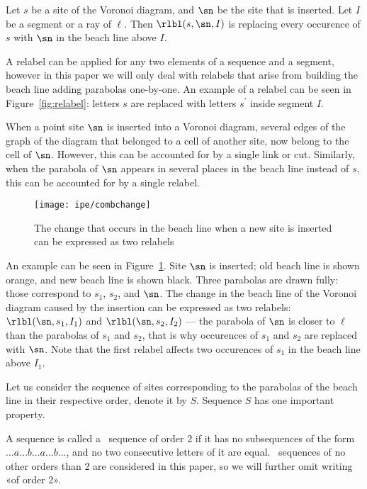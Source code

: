 \begin{definition}
	Let $s$ be a site of the Voronoi diagram, and $\sn$ be the site that is inserted. Let $I$ be a segment or a ray of $\ell$. Then $\rlbl(s,\sn,I)$ is replacing every occurence of $s$ with $\sn$ in the beach line above $I$.
\end{definition}

A relabel can be applied for any two elements of a sequence and a segment, however in this paper we will only deal with relabels that arise from building the beach line adding parabolas one-by-one. An example of a relabel can be seen in Figure~\ref{fig:relabel}: letters $s$ are replaced with letters $s^\prime$ inside segment $I$.



When a point site $\sn$ is inserted into a Voronoi diagram, several edges of the graph of the diagram that belonged to a cell of another site, now belong to the cell of $\sn$. However, this can be accounted for by a single link or cut. Similarly, when the parabola of $\sn$ appears in several places in the beach line instead of $s$, this can be accounted for by a single relabel.

\begin{figure}[h] \centering
	\texttt{[image: ipe/combchange]}
	\caption{The change that occurs in the beach line when a new site is inserted can be expressed as two relabels}
	\label{fig:combchange}
\end{figure}

An example can be seen in Figure~\ref{fig:combchange}. Site $\sn$ is inserted; old beach line is shown orange, and new beach line is shown black. Three parabolas are drawn fully: those correspond to $s_1$, $s_2$, and $\sn$. The change in the beach line of the Voronoi diagram caused by the insertion can be expressed as two relabels: $\rlbl(\sn,s_1,I_1)$ and $\rlbl(\sn,s_2,I_2)$ — the parabola of $\sn$ is closer to $\ell$ than the parabolas of $s_1$ and $s_2$, that is why occurences of $s_1$ and $s_2$ are replaced with $\sn$. Note that the first relabel affects two occurences of $s_1$ in the beach line above $I_1$.

Let us consider the sequence of sites corresponding to the parabolas of the beach line in their respective order, denote it by $S$. Sequence $S$ has one important property.

\begin{definition}
	A sequence is called a \Ds~sequence of order 2 if it has no subsequences of the form
	$\ldots a \ldots b \ldots a \ldots b \ldots$,
	and no two consecutive letters of it are equal.
	\Ds~sequences of no other orders than 2 are considered in this paper, so we will further omit writing «of order 2».
\end{definition}

